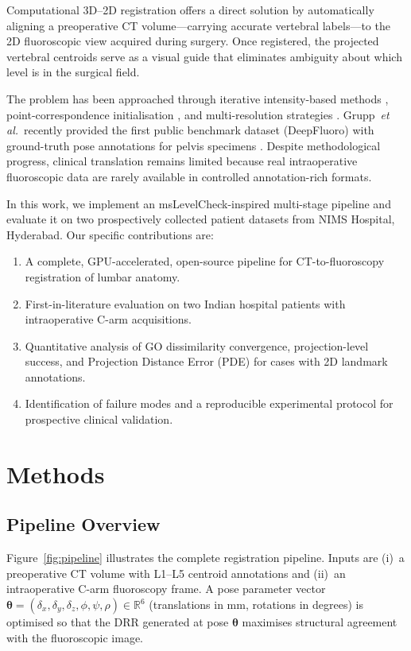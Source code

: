 \documentclass[10pt,a4paper]{article}
\begin{document}
Computational 3D--2D registration offers a direct solution by
automatically aligning a preoperative CT volume—carrying accurate
vertebral labels—to the 2D fluoroscopic view acquired during surgery.
Once registered, the projected vertebral centroids serve as a visual
guide that eliminates ambiguity about which level is in the surgical
field.

The problem has been approached through iterative intensity-based
methods \citep{Weese1997,Tomazevic2003}, point-correspondence
initialisation \citep{Ma2003}, and multi-resolution
strategies \citep{Ketcha2017}.
Grupp~\emph{et al.}\ recently provided the first public benchmark
dataset (DeepFluoro) with ground-truth pose annotations
for pelvis specimens \citep{Grupp2020}.
Despite methodological progress, clinical translation remains limited
because real intraoperative fluoroscopic data are rarely available in
controlled annotation-rich formats.

In this work, we implement an msLevelCheck-inspired multi-stage
pipeline and evaluate it on two prospectively collected patient datasets
from NIMS Hospital, Hyderabad.
Our specific contributions are:
\begin{enumerate}
  \item A complete, GPU-accelerated, open-source pipeline for
        CT-to-fluoroscopy registration of lumbar anatomy.
  \item First-in-literature evaluation on two Indian hospital patients
        with intraoperative C-arm acquisitions.
  \item Quantitative analysis of GO dissimilarity convergence,
        projection-level success, and Projection Distance Error (PDE)
        for cases with 2D landmark annotations.
  \item Identification of failure modes and a reproducible
        experimental protocol for prospective clinical validation.
\end{enumerate}

\section{Methods}
\label{sec:methods}

\subsection{Pipeline Overview}
\label{sec:pipeline}

Figure~\ref{fig:pipeline} illustrates the complete registration
pipeline.
Inputs are (i)~a preoperative CT volume with L1--L5 centroid annotations
and (ii)~an intraoperative C-arm fluoroscopy frame.
A pose parameter vector $\boldsymbol{\theta}=(\delta_x,\delta_y,\delta_z,
\phi,\psi,\rho)\in\mathbb{R}^6$ (translations in mm, rotations in
degrees) is optimised so that the DRR generated at pose
$\boldsymbol{\theta}$ maximises structural agreement with the
fluoroscopic image.
\end{document}
